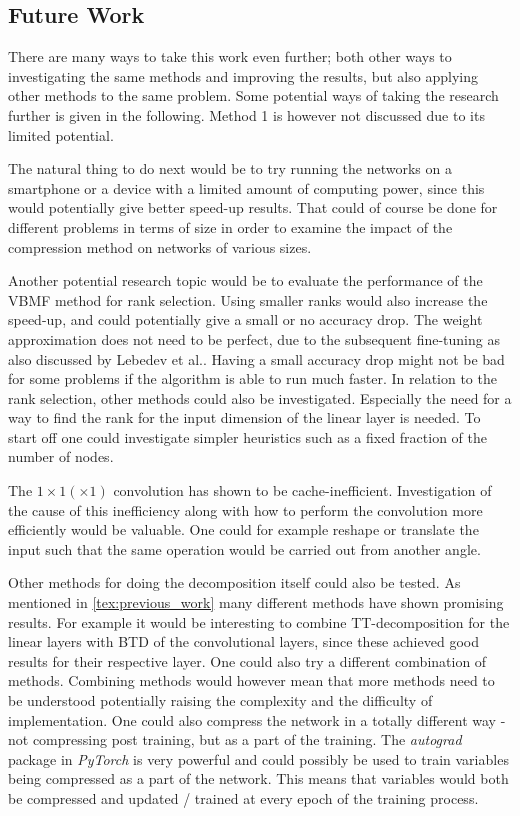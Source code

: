 \subsection{Future Work} \label{tex:future_work}
There are many ways to take this work even further; both other ways to investigating the same methods and improving the results, but also applying other methods to the same problem. Some potential ways of taking the research further is given in the following. Method 1 is however not discussed due to its limited potential.

The natural thing to do next would be to try running the networks on a smartphone or a device with a limited amount of computing power, since this would potentially give better speed-up results. That could of course be done for different problems in terms of size in order to examine the impact of the compression method on networks of various sizes.

Another potential research topic would be to evaluate the performance of the VBMF method for rank selection. Using smaller ranks would also increase the speed-up, and could potentially give a small or no accuracy drop. The weight approximation does not need to be perfect, due to the subsequent fine-tuning as also discussed by Lebedev et al.\cite{Lebedev2015}. Having a small accuracy drop might not be bad for some problems if the algorithm is able to run much faster. In relation to the rank selection, other methods could also be investigated. Especially the need for a way to find the rank for the input dimension of the linear layer is needed. To start off one could investigate simpler heuristics such as a fixed fraction of the number of nodes.

The $1\times 1 (\times 1)$ convolution has shown to be cache-inefficient. Investigation of the cause of this inefficiency along with how to perform the convolution more efficiently would be valuable. One could for example reshape or translate the input such that the same operation would be carried out from another angle. 

Other methods for doing the decomposition itself could also be tested. As mentioned in \autoref{tex:previous_work} many different methods have shown promising results. For example it would be interesting to combine TT-decomposition for the linear layers with BTD of the convolutional layers, since these achieved good results for their respective layer. One could also try a different combination of methods. Combining methods would however mean that more methods need to be understood potentially raising the complexity and the difficulty of implementation. One could also compress the network in a totally different way - not compressing post training, but as a part of the training. The \textit{autograd} package in \textit{PyTorch} is very powerful and could possibly be used to train variables being compressed as a part of the network. This means that variables would both be compressed and updated / trained at every epoch of the training process.